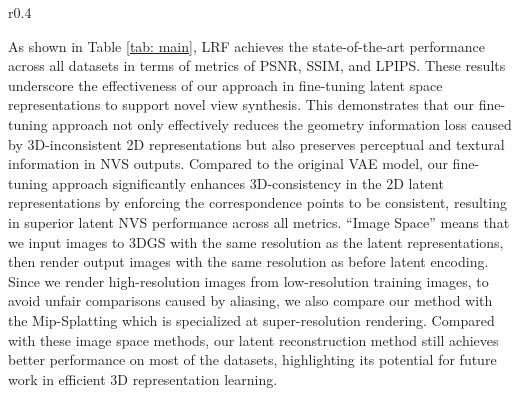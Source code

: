 \begin{wraptable}{r}{0.4\textwidth}
    \vspace{-0pt}
    \centering
    \footnotesize
    \caption{A comparison of different methods on LLFF dataset using 3 views.}
    \vspace{-1em}
    \label{tab:llff_comparison}
\end{wraptable}


As shown in Table \ref{tab: main}, LRF achieves the state-of-the-art performance across all datasets in terms of metrics of PSNR, SSIM, and LPIPS. These results underscore the effectiveness of our approach in fine-tuning latent space representations to support novel view synthesis. This demonstrates that our fine-tuning approach not only effectively reduces the geometry information loss caused by 3D-inconsistent 2D representations but also preserves perceptual and textural information in NVS outputs. Compared to the original VAE model, our fine-tuning approach significantly enhances 3D-consistency in the 2D latent representations by enforcing the correspondence points to be consistent, resulting in superior latent NVS performance across all metrics. ``Image Space'' means that we input images to 3DGS with the same resolution as the latent representations, then render output images with the same resolution as before latent encoding. Since we render high-resolution images from low-resolution training images, to avoid unfair comparisons caused by aliasing, we also compare our method with the Mip-Splatting \citep{Yu2024MipSplatting} which is specialized at super-resolution rendering. Compared with these image space methods, our latent reconstruction method still achieves better performance on most of the datasets, highlighting its potential for future work in efficient 3D representation learning.

